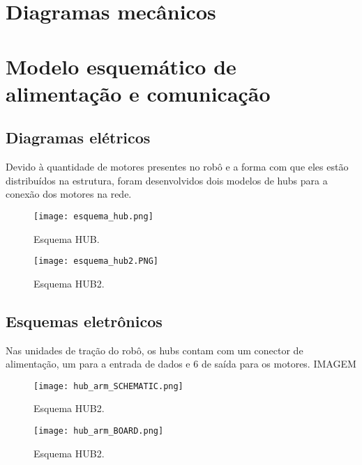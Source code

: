 \section{Diagramas mecânicos}
\label{sec:diagm}


\section{Modelo esquemático de alimentação e comunicação}
\label{sec:modesq}


\subsection{Diagramas elétricos}
\label{sec:diage}
Devido à quantidade de motores presentes no robô e a forma com que eles estão distribuídos na estrutura, foram desenvolvidos dois modelos de hubs para a conexão dos motores na rede.

\begin{figure}[h!]												
	\centering												
	\texttt{[image: esquema\_hub.png]}				
	\caption{Esquema HUB.}		
	\label{img:hub1}									
\end{figure}

\begin{figure}[h!]												
	\centering												
	\texttt{[image: esquema\_hub2.PNG]}				
	\caption{Esquema HUB2.}		
	\label{img:hub2}									
\end{figure}

\subsection{Esquemas eletrônicos}
\label{ssec:esqe}
Nas unidades de tração do robô, os hubs contam com um conector de alimentação, um para a entrada de dados e 6 de saída para os motores.
IMAGEM
\begin{figure}[h!]												
	\centering												
	\texttt{[image: hub\_arm\_SCHEMATIC.png]}				
	\caption{Esquema HUB2.}		
	\label{img:hub2}									
\end{figure}

\begin{figure}[h!]												
	\centering												
	\texttt{[image: hub\_arm\_BOARD.png]}				
	\caption{Esquema HUB2.}		
	\label{img:hub2}									
\end{figure}

